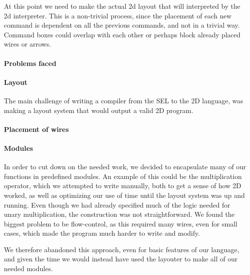 At this point we need to make the actual 2d layout that will
interpreted by the 2d interpreter. This is a non-trivial process,
since the placement of each new command is dependent on all the
previous commands, and not in a trivial way. Command boxes could
overlap with each other or perhaps block already placed wires or
arrows.

\paragraph{Problems faced}
\label{compiler:problems}

\paragraph{Layout}
\label{compiler:layout}
The main challenge of writing a compiler from the SEL to the 2D
language, was making a layout system that would output a valid 2D program.

\paragraph{Placement of wires}
\label{compiler:placement}


\paragraph{Modules}
\label{compiler:modules}
In order to cut down on the needed work, we decided to encapsulate
many of our functions in predefined modules. An example of this could
be the multiplication operator, which we attempted to write manually,
both to get a sense of how 2D worked, as well as optimizing our use of
time until the layout system was up and running. Even though we had
already specified much of the logic needed for unary multiplication,
the construction was not straightforward. We found the biggest
problem to be flow-control, as this required many wires, even for
small cases, which made the program much harder to write and modify.

We therefore abandoned this approach, even for basic features of our
language, and given the time we would instead have used the layouter
to make all of our needed modules.

